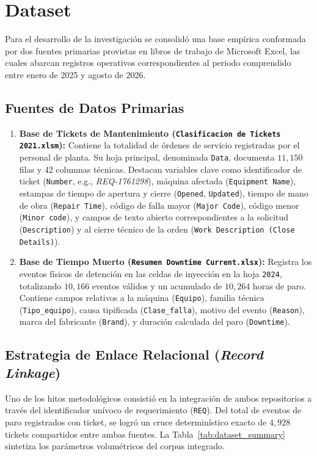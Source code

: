 \documentclass[conference]{IEEEtran}
\begin{document}
\section{Dataset}
Para el desarrollo de la investigación se consolidó una base empírica conformada por dos fuentes primarias provistas en libros de trabajo de Microsoft Excel, las cuales abarcan registros operativos correspondientes al periodo comprendido entre enero de 2025 y agosto de 2026.

\subsection{Fuentes de Datos Primarias}
\begin{enumerate}
    \item \textbf{Base de Tickets de Mantenimiento (\texttt{Clasificacion de Tickets 2021.xlsm}):} 
    Contiene la totalidad de órdenes de servicio registradas por el personal de planta. Su hoja principal, denominada \texttt{Data}, documenta $11,150$ filas y 42 columnas técnicas. Destacan variables clave como identificador de ticket (\texttt{Number}, e.g., \textit{REQ-1761298}), máquina afectada (\texttt{Equipment Name}), estampas de tiempo de apertura y cierre (\texttt{Opened}, \texttt{Updated}), tiempo de mano de obra (\texttt{Repair Time}), código de falla mayor (\texttt{Major Code}), código menor (\texttt{Minor code}), y campos de texto abierto correspondientes a la solicitud (\texttt{Description}) y al cierre técnico de la orden (\texttt{Work Description (Close Details)}).
    
    \item \textbf{Base de Tiempo Muerto (\texttt{Resumen Downtime Current.xlsx}):}
    Registra los eventos físicos de detención en las celdas de inyección en la hoja \texttt{2024}, totalizando $10,166$ eventos válidos y un acumulado de $10,264$ horas de paro. Contiene campos relativos a la máquina (\texttt{Equipo}), familia técnica (\texttt{Tipo\_equipo}), causa tipificada (\texttt{Clase\_falla}), motivo del evento (\texttt{Reason}), marca del fabricante (\texttt{Brand}), y duración calculada del paro (\texttt{Downtime}).
\end{enumerate}

\subsection{Estrategia de Enlace Relacional (\textit{Record Linkage})}
Uno de los hitos metodológicos consistió en la integración de ambos repositorios a través del identificador unívoco de requerimiento (\texttt{REQ}). Del total de eventos de paro registrados con ticket, se logró un cruce determinístico exacto de $4,928$ tickets compartidos entre ambas fuentes. La Tabla~\ref{tab:dataset_summary} sintetiza los parámetros volumétricos del corpus integrado.
\end{document}
